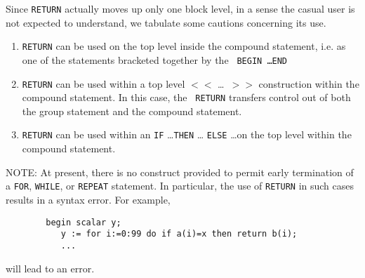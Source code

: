 Since {\tt RETURN} actually moves up only one
block level, in a sense the casual user is not expected to
understand, we tabulate some cautions concerning its use.
\begin{enumerate}
\item {\tt RETURN} can be used on the top level inside the compound
statement, i.e. as one of the statements bracketed together by the {\tt
BEGIN \ldots END}

\item {\tt RETURN} can be used within a top level {\tt $<<$} \ldots {\tt
$>>$} construction within the compound statement.  In this case, the {\tt
RETURN} transfers control out of both the group statement and the compound
statement.

\item {\tt RETURN} can be used within an {\tt IF} \ldots {\tt THEN} \ldots
{\tt ELSE} \ldots on the top level within the compound statement.
\end{enumerate}
NOTE:  At present, there is no construct provided to permit early
termination of a {\tt FOR}, {\tt WHILE},
or {\tt REPEAT} statement.  In particular, the use of
{\tt RETURN} in such cases results in a syntax error.  For example,
\begin{verbatim}
        begin scalar y;
           y := for i:=0:99 do if a(i)=x then return b(i);
           ...
\end{verbatim}
will lead to an error.

